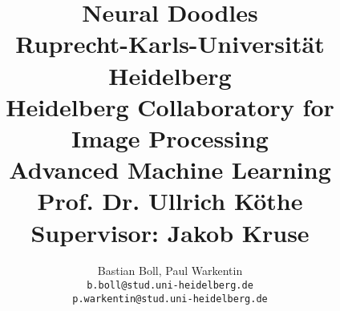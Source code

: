 
\title{%
  {\LARGE \textbf{Neural Doodles}} \\[0.5cm]
  {\large Ruprecht-Karls-Universität Heidelberg} \\
  {\large Heidelberg Collaboratory for Image Processing} \\[0.5cm]
  {\large Advanced Machine Learning} \\[-0.2cm]
  {\large Prof. Dr. Ullrich Köthe} \\
  {\large Supervisor: Jakob Kruse}
}

\author{%
  Bastian Boll, Paul Warkentin \\
  {\tt\small b.boll@stud.uni-heidelberg.de} \\
  {\tt\small p.warkentin@stud.uni-heidelberg.de}
}

\maketitle
